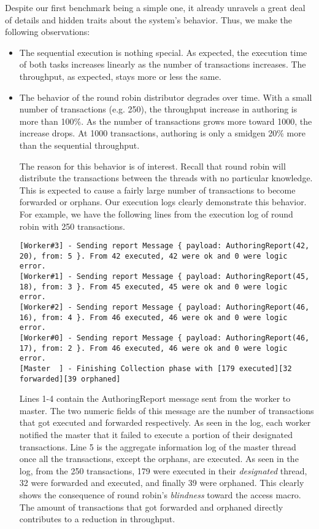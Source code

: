 
Despite our first benchmark being a simple one, it already unravels a great deal of details and
hidden traits about the system's behavior.
Thus, we make the following observations: 
\begin{itemize}
	\item The sequential execution is nothing special. As expected, the execution time of both tasks
	increases linearly as the number of transactions increases. The throughput, as expected, stays
	more or less the same.
	\item The behavior of the round robin distributor degrades over time. With a small number of
	transactions (e.g. 250), the throughput increase in authoring is more than 100\%. As the number
	of transactions grows more toward 1000, the increase drops. At 1000 transactions, authoring is
	only a smidgen 20\% more than the sequential throughput.

	The reason for this behavior is of interest. Recall that round robin will distribute the
	transactions between the threads with no particular knowledge. This is expected to cause a
	fairly large number of transactions to become forwarded or orphans. Our execution logs clearly
	demonstrate this behavior. For example, we have the following lines from the execution log of
	round robin with 250 transactions.

	\begin{lstlisting}
[Worker#3] - Sending report Message { payload: AuthoringReport(42, 20), from: 5 }. From 42 executed, 42 were ok and 0 were logic error.
[Worker#1] - Sending report Message { payload: AuthoringReport(45, 18), from: 3 }. From 45 executed, 45 were ok and 0 were logic error.
[Worker#2] - Sending report Message { payload: AuthoringReport(46, 16), from: 4 }. From 46 executed, 46 were ok and 0 were logic error.
[Worker#0] - Sending report Message { payload: AuthoringReport(46, 17), from: 2 }. From 46 executed, 46 were ok and 0 were logic error.
[Master  ] - Finishing Collection phase with [179 executed][32 forwarded][39 orphaned]
	\end{lstlisting}

	Lines 1-4 contain the AuthoringReport message sent from the worker to master. The two numeric
	fields of this message are the number of transactions that got executed and forwarded
	respectively. As seen in the log, each worker notified the master that it failed to execute a
	portion of their designated transactions. Line 5 is the aggregate information log of the master
	thread once all the transactions, except the orphans, are executed. As seen in the log, from the
	250 transactions, 179 were executed in their \textit{designated} thread, 32 were forwarded and
	executed, and finally 39 were orphaned.	This clearly shows the consequence of round robin's \textit{blindness} toward the access macro.
	The amount of transactions that got forwarded and orphaned directly contributes to a reduction
	in throughput. 
	

\end{itemize}
